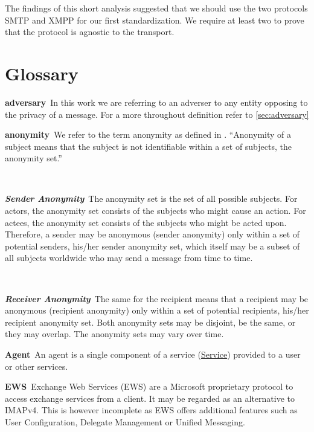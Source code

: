 \documentclass[a4paper,appendixprefix,pdfusetitle,twocolumn,fontsize=8pt,draft,DIV=calc]{scrbook}
\newenvironment{entry}{\par\leavevmode\hangpara{1.5mm}{1}\ignorespaces}{\RaggedRight\par}
\newcommand*{\mainentry}[2]{{\bfseries{#1\label{def:#1}}}~#2\par}
\newcommand*{\subentry}[2]{\par~\begin{minipage}{\columnwidth-0.6cm}{\bfseries{\itshape{#1\label{def:#1}}}}~#2\end{minipage}}
\newcommand*{\defref}[1]{\hyperref[def:#1]{#1}}
\begin{document}
The findings of this short analysis suggested that we should use the two protocols SMTP and XMPP for our first standardization. We require at least two to prove that the protocol is agnostic to the transport.

\clearpage\chapter{Glossary}

\begin{entry}
	\mainentry{adversary}{In this work we are referring to an adverser to any entity opposing to the privacy of a message. For a more throughout definition refer to \ref{sec:adversary}}
\end{entry}

\begin{entry}
	\mainentry{anonymity}{We refer to the term anonymity as defined in \cite{anonTerminology}. ``Anonymity of a subject means that the subject is not identifiable within a set of subjects, the anonymity set.''\omitted}
	\subentry{Sender Anonymity}{The anonymity set is the set of all possible subjects. For actors, the anonymity set consists of the subjects who might cause an action. For actees, the anonymity set consists of the subjects who might be acted upon. Therefore, a sender may be anonymous (sender anonymity) only within a set of potential senders, his/her sender anonymity set, which itself may be a subset of all subjects worldwide who may send a message from time to time.}
	\subentry{Receiver Anonymity}{The same for the recipient means that a recipient may be anonymous (recipient anonymity) only within a set of potential recipients, his/her recipient anonymity set. Both anonymity sets may be disjoint, be the same, or they may overlap. The anonymity sets may vary over time.}
\end{entry}

\begin{entry}
	\mainentry{Agent}{An agent is a single component of a service (\defref{Service}) provided to a user or other services.}
\end{entry}

\begin{entry}
	\mainentry{EWS}{Exchange Web Services (EWS) are a Microsoft proprietary protocol to access exchange services from a client. It may be regarded as an alternative to IMAPv4. This is however incomplete as EWS offers additional features such as User Configuration, Delegate Management or Unified Messaging.}
\end{entry}
\end{document}
